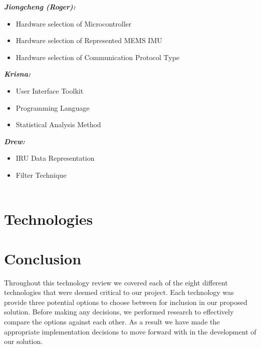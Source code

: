 \documentclass[letterpaper,10pt,onecolumn]{IEEEtran}
\begin{document}
\textit{\textbf{Jiongcheng (Roger):}}
\begin{itemize}
	\item Hardware selection of Microcontroller
	\item Hardware selection of Represented MEMS IMU
	\item Hardware selection of Communication Protocol Type
\end{itemize}

\textit{\textbf{Krisna:}}
\begin{itemize}
	\item User Interface Toolkit
	\item Programming Language
	\item Statistical Analysis Method
\end{itemize}

\textit{\textbf{Drew:}}
\begin{itemize}
	\item IRU Data Representation
	\item Filter Technique\\\\
\end{itemize}



\section{Technologies}
	
	
	

\section{Conclusion}
Throughout this technology review we covered each of the eight different technologies that were deemed critical to our project.
Each technology was provide three potential options to choose between for inclusion in our proposed solution.
Before making any decisions, we performed research to effectively compare the options against each other.
As a result we have made the appropriate implementation decisions to move forward with in the development of our solution.


\newpage
\nocite{*}


\end{document}
